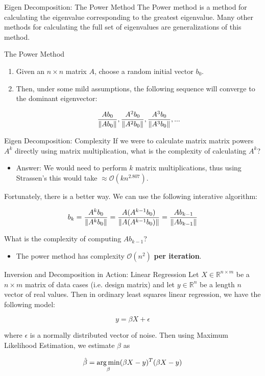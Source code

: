 \documentclass[serif,xcolor=pdftex,dvipsnames,table,hyperref={bookmarks=false,breaklinks}]{beamer}
\begin{document}
\begin{frame}[t]{Eigen Decomposition: The Power Method}
	The Power method is a method for calculating the eigenvalue corresponding to the greatest eigenvalue. Many other methods for calculating the full set of eigenvalues are generalizations of this method.
	
	\pause
	\begin{block}{The Power Method}
		\begin{enumerate}[<+->]
			\item Given an $n\times n$ matrix $A$, choose a random initial vector $b_0$.
			\item Then, under some mild assumptions, the following sequence will converge to the dominant eigenvector:
			
			$$\frac{Ab_0}{\left\lVert Ab_0\right\rVert},\frac{A^2b_0}{\left\lVert A^2b_0\right\rVert},\frac{A^3b_0}{\left\lVert A^3b_0\right\rVert},...$$
		\end{enumerate}
	\end{block}
	
\end{frame}

\begin{frame}[t]{Eigen Decomposition: Complexity}
	If we were to calculate matrix matrix powers $A^k$ directly using matrix multiplication, what is the complexity of calculating $A^k$?
	
	\pause
	\begin{itemize}
		\item Answer: We would need to perform $k$ matrix multiplications, thus using Strassen's this would take $\approx\mathcal{O}(kn^{2.807})$.
	\end{itemize}
	
	\pause
	Fortunately, there is a better way. We can use the following interative algorithm:
	
	$$b_{k} = \frac{A^kb_0}{\left\lVert A^kb_0\right\rVert} = \frac{A(A^{k-1}b_0)}{\left\lVert A(A^{k-1}b_0)\right\rVert} = \frac{Ab_{k-1}}{\left\lVert Ab_{k-1}\right\rVert}$$
	
	\pause
	What is the complexity of computing $Ab_{k-1}$?
	
	\pause
	\begin{itemize}
		\item The power method has complexity $\mathcal{O}(n^2)$ \textbf{per iteration}.
	\end{itemize}
\end{frame}

\begin{frame}[t]{Inversion and Decomposition in Action: Linear Regression}
	Let $X \in \mathbb{R}^{n\times m}$ be a $n \times m$ matrix of data cases (i.e. design matrix) and let $y \in \mathbb{R}^n$ be a length $n$ vector of real values. Then in ordinary least squares linear regression, we have the following model:

	$$y = \beta X + \epsilon$$

	where $\epsilon$ is a normally distributed vector of noise. \pause Then using Maximum Likelihood Estimation, we estimate $\hat{\beta}$ as

	$$\hat{\beta} = \operatorname*{arg\,min}_\beta (\beta X - y)^T(\beta X - y)$$
	
\end{frame}
\end{document}
